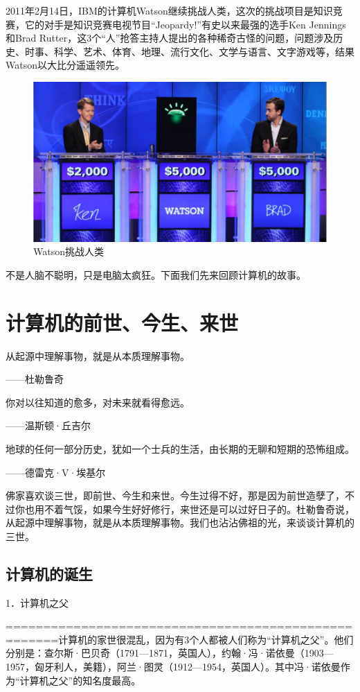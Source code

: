 \documentclass[12pt,UTF8]{ctexbook}
\begin{document}
2011年2月14日，IBM的计算机Watson继续挑战人类，这次的挑战项目是知识竞赛，它的对手是知识竞赛电视节目“Jeopardy!”有史以来最强的选手Ken Jennings和Brad Rutter，这3个“人”抢答主持人提出的各种稀奇古怪的问题，问题涉及历史、时事、科学、艺术、体育、地理、流行文化、文学与语言、文字游戏等，结果Watson以大比分遥遥领先。

\begin{figure}[htbp]
	\centering
	\includegraphics[width=0.7\linewidth]{2}
	\caption{Watson挑战人类}
	\label{fig:1}
\end{figure}

不是人脑不聪明，只是电脑太疯狂。下面我们先来回顾计算机的故事。

\section{计算机的前世、今生、来世}

从起源中理解事物，就是从本质理解事物。

——杜勒鲁奇

你对以往知道的愈多，对未来就看得愈远。

——温斯顿·丘吉尔

地球的任何一部分历史，犹如一个士兵的生活，由长期的无聊和短期的恐怖组成。

——德雷克·V·埃基尔

佛家喜欢谈三世，即前世、今生和来世。今生过得不好，那是因为前世造孽了，不过你也用不着气馁，如果今生好好修行，来世还是可以过好日子的。杜勒鲁奇说，从起源中理解事物，就是从本质理解事物。我们也沾沾佛祖的光，来谈谈计算机的三世。

\subsection{计算机的诞生}

1．计算机之父

=====================================================计算机的家世很混乱，因为有3个人都被人们称为“计算机之父”。他们分别是：查尔斯·巴贝奇（1791—1871，英国人），约翰·冯·诺依曼（1903—1957，匈牙利人，美籍），阿兰·图灵（1912—1954，英国人）。其中冯·诺依曼作为“计算机之父”的知名度最高。
\end{document}

